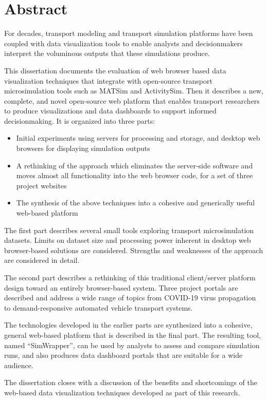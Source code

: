 \chapter*{Abstract}

For decades, transport modeling and transport simulation platforms have been coupled with data visualization tools to enable analysts and decisionmakers interpret the voluminous outputs that these simulations produce.

This dissertation documents the evaluation of web browser based data visualization techniques that integrate with open-source transport microsimulation tools such as MATSim and ActivitySim. Then it describes a new, complete, and novel open-source web platform that enables transport researchers to produce visualizations and data dashboards to support informed decisionmaking. It is organized into three parts:

\begin{itemize}
  \item Initial experiments using servers for processing and storage, and desktop web browsers for displaying simulation outputs
  \item A rethinking of the approach which eliminates the server-side software and moves almost all functionality into the web browser code, for a set of three project websites
  \item The synthesis of the above techniques into a cohesive and generically useful web-based platform
\end{itemize}

The first part describes several small tools exploring transport microsimulation datasets. Limits on dataset size and processing power inherent in desktop web browser-based solutions are considered. Strengths and weaknesses of the approach are considered in detail.

The second part describes a rethinking of this traditional client/server platform design toward an entirely browser-based system. Three project portals are described and address a wide range of topics from COVID-19 virus propagation to demand-responsive automated vehicle transport systems.

The technologies developed in the earlier parts are synthesized into a cohesive, general web-based platform that is described in the final part. The resulting tool, named ``SimWrapper'', can be used by analysts to assess and compare simulation runs, and also produces data dashboard portals that are suitable for a wide audience.

The dissertation closes with a discussion of the benefits and shortcomings of the web-based data visualization techniques developed as part of this research.
